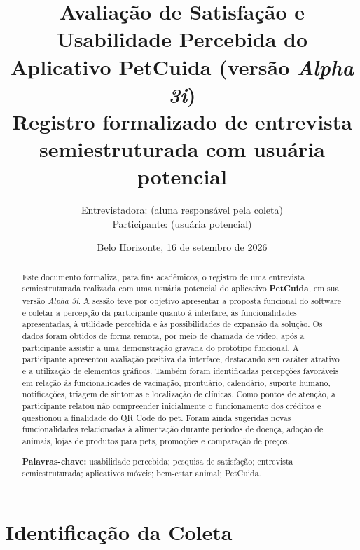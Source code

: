 \documentclass[12pt,a4paper]{article}
\title{\textbf{Avaliação de Satisfação e Usabilidade Percebida do\\
Aplicativo PetCuida (versão \textit{Alpha 3i})}\\[0.4cm]
\large Registro formalizado de entrevista semiestruturada com usuária potencial}
\author{Entrevistadora: \entrevistador{} (aluna responsável pela coleta)\\
Participante: \participante{} (usuária potencial)}
\date{Belo Horizonte, 16 de setembro de 2026}
\begin{document}
\maketitle
\thispagestyle{empty}

\begin{abstract}
\noindent Este documento formaliza, para fins acadêmicos, o registro de uma entrevista
semiestruturada realizada com uma usuária potencial do aplicativo \textbf{PetCuida}, em sua
versão \textit{Alpha 3i}. A sessão teve por objetivo apresentar a proposta funcional do
software e coletar a percepção da participante quanto à interface, às funcionalidades
apresentadas, à utilidade percebida e às possibilidades de expansão da solução. Os dados
foram obtidos de forma remota, por meio de chamada de vídeo, após a participante assistir
a uma demonstração gravada do protótipo funcional. A participante apresentou avaliação
positiva da interface, destacando seu caráter atrativo e a utilização de elementos gráficos.
Também foram identificadas percepções favoráveis em relação às funcionalidades de vacinação,
prontuário, calendário, suporte humano, notificações, triagem de sintomas e localização de
clínicas. Como pontos de atenção, a participante relatou não compreender inicialmente o
funcionamento dos créditos e questionou a finalidade do QR Code do pet. Foram ainda
sugeridas novas funcionalidades relacionadas à alimentação durante períodos de doença,
adoção de animais, lojas de produtos para pets, promoções e comparação de preços.

\vspace{0.4cm}
\noindent\textbf{Palavras-chave:} usabilidade percebida; pesquisa de satisfação; entrevista
semiestruturada; aplicativos móveis; bem-estar animal; PetCuida.
\end{abstract}

\newpage
\tableofcontents
\newpage

\section{Identificação da Coleta}
\end{document}
